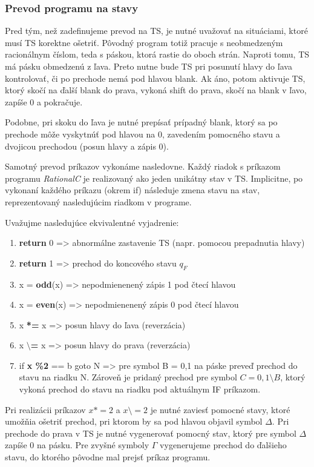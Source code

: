 \documentclass[10pt]{article}
\begin{document}
\subsubsection*{Prevod programu na stavy}
Pred tým, než zadefinujeme prevod na TS, je nutné uvažovať na situáciami, ktoré musí TS korektne
ošetriť. Pôvodný program totiž pracuje s neobmedzeným racionálnym číslom, teda s páskou, ktorá
rastie do oboch strán. Naproti tomu, TS má pásku obmedzenú z ľava. Preto nutne bude TS pri posunutí
hlavy do ľava kontrolovať, či po prechode nemá pod hlavou blank. Ak áno, potom aktivuje TS, ktorý
skočí na ďalší blank do prava, vykoná shift do prava, skočí na blank v ľavo, zapíše 0 a pokračuje.

Podobne, pri skoku do ľava je nutné prepísať prípadný blank, ktorý sa po prechode môže vyskytnúť pod
hlavou na 0, zavedením pomocného stavu a dvojicou prechodou (posun hlavy a zápis 0).

Samotný prevod príkazov vykonáme nasledovne. Každý riadok s príkazom programu \textit{RationalC} je realizovaný ako jeden unikátny stav v TS.
Implicitne, po vykonaní každého príkazu (okrem if) následuje zmena stavu na stav, reprezentovaný
nasledujúcim riadkom v programe. 

Uvažujme nasledujúce ekvivalentné vyjadrenie:
\begin{enumerate}
    \item \textbf{return} 0 => abnormálne zastavenie TS (napr. pomocou prepadnutia hlavy)
    \item \textbf{return} 1 => prechod do koncového stavu $q_F$
    \item x = \textbf{odd}(x) => nepodmienenený zápis 1 pod čtecí hlavou
    \item x = \textbf{even}(x) => nepodmienenený zápis 0 pod čtecí hlavou
    \item x \textbf{*=} x => posun hlavy do ľava (reverzácia)
    \item x \textbf{$\setminus$=} x => posun hlavy do prava (reverzácia)
    \item if \textbf{x \%2} == b goto N => pre symbol B = {0,1} na páske preveď prechod do stavu na riadku N. Zároveň je pridaný prechod pre symbol $C = {0,1}\setminus {B}$, ktorý
        vykoná prechod do stavu na riadku pod aktuálnym IF príkazom.
\end{enumerate}

Pri realizácii príkazov $x *= 2$ a $x \setminus = 2$ je nutné zaviesť pomocné stavy, ktoré umožňia ošetriť prechod, pri ktorom by sa pod hlavou objavil symbol 
$\Delta$. Pri prechode do prava v TS je nutné vygenerovať pomocný stav, ktorý pre symbol $\Delta$ zapíše 0 na pásku. Pre zvyšné symboly $\Gamma$ vygenerujeme prechod do ďalšieho stavu,
do ktorého pôvodne mal prejsť príkaz programu.
\end{document}
